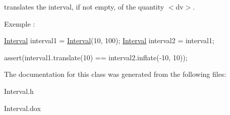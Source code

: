 translates the interval, if not empty, of the quantity {\ttfamily $<$dv$>$}.

Exemple \+: 
\begin{DoxyCode}
\mbox{\hyperlink{classHurricane_1_1Interval_a02b04ad7ca380422098992fa8ff5f546}{Interval}} interval1 = \mbox{\hyperlink{classHurricane_1_1Interval_a02b04ad7ca380422098992fa8ff5f546}{Interval}}(10, 100);
\mbox{\hyperlink{classHurricane_1_1Interval_a02b04ad7ca380422098992fa8ff5f546}{Interval}} interval2 = interval1;
 
assert(interval1.translate(10) == interval2.inflate(-10, 10));
\end{DoxyCode}
 

The documentation for this class was generated from the following files\+:\begin{DoxyCompactItemize}
\item 
Interval.\+h\item 
Interval.\+dox\end{DoxyCompactItemize}
